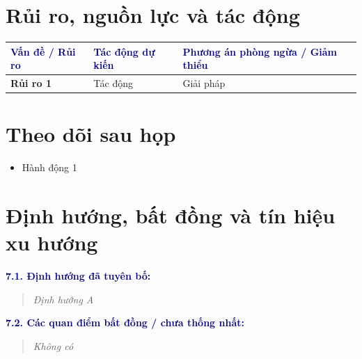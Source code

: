 \documentclass[11pt,a4paper]{article}
\begin{document}
\section{Rủi ro, nguồn lực và tác động}

\begin{tabularx}{\textwidth}{@{}>{\raggedright\arraybackslash\bfseries}p{3.6cm} >{\raggedright\arraybackslash}X >{\raggedright\arraybackslash}p{4.8cm}@{}}
  \toprule
  \rowcolor{light}
  \textcolor{navy}{Vấn đề / Rủi ro} & \textcolor{navy}{Tác động dự kiến} & \textcolor{navy}{Phương án phòng ngừa / Giảm thiểu} \\
  \midrule
  Rủi ro 1 & Tác động & Giải pháp \\
  \midrule
  \bottomrule
\end{tabularx}

\section{Theo dõi sau họp}

\begin{itemize}[leftmargin=1.5em, itemsep=3pt]
  \item Hành động 1
\end{itemize}

\section{Định hướng, bất đồng và tín hiệu xu hướng}

\textbf{\textcolor{navy}{7.1. Định hướng đã tuyên bố:}}
\begin{quote}
  \textit{ Định hướng A }
\end{quote}

\textbf{\textcolor{navy}{7.2. Các quan điểm bất đồng / chưa thống nhất:}}
\begin{quote}
  \textit{ Không có }
\end{quote}
\end{document}
